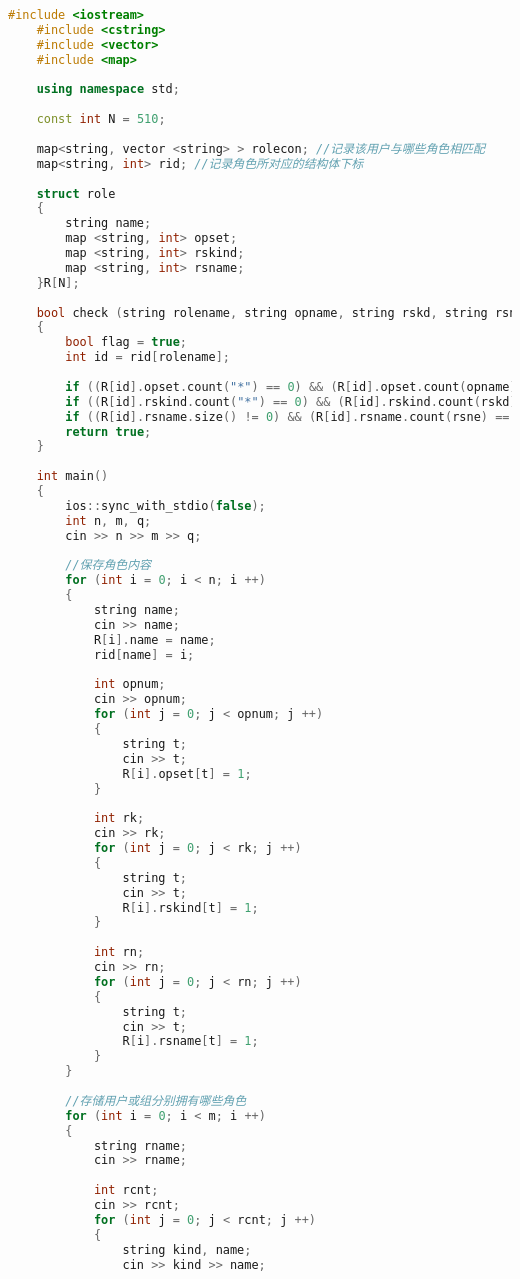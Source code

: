 \begin{lstlisting}[language=C++]
    #include <iostream>
    #include <cstring>
    #include <vector>
    #include <map>
    
    using namespace std;
    
    const int N = 510;
    
    map<string, vector <string> > rolecon; //记录该用户与哪些角色相匹配
    map<string, int> rid; //记录角色所对应的结构体下标
    
    struct role
    {
        string name;
        map <string, int> opset;
        map <string, int> rskind;
        map <string, int> rsname;
    }R[N];
    
    bool check (string rolename, string opname, string rskd, string rsne)
    {
        bool flag = true;
        int id = rid[rolename];
    
        if ((R[id].opset.count("*") == 0) && (R[id].opset.count(opname) == 0)) return false;
        if ((R[id].rskind.count("*") == 0) && (R[id].rskind.count(rskd) == 0)) return false;
        if ((R[id].rsname.size() != 0) && (R[id].rsname.count(rsne) == 0)) return false;
        return true;
    }
    
    int main()
    {
        ios::sync_with_stdio(false);
        int n, m, q;
        cin >> n >> m >> q;
    
        //保存角色内容
        for (int i = 0; i < n; i ++)
        {
            string name;
            cin >> name;
            R[i].name = name;
            rid[name] = i;
    
            int opnum;
            cin >> opnum;
            for (int j = 0; j < opnum; j ++)
            {
                string t;
                cin >> t;
                R[i].opset[t] = 1;
            }
    
            int rk;
            cin >> rk;
            for (int j = 0; j < rk; j ++)
            {
                string t;
                cin >> t;
                R[i].rskind[t] = 1;
            }
    
            int rn;
            cin >> rn;
            for (int j = 0; j < rn; j ++)
            {
                string t;
                cin >> t;
                R[i].rsname[t] = 1;
            }
        }
    
        //存储用户或组分别拥有哪些角色
        for (int i = 0; i < m; i ++)
        {
            string rname;
            cin >> rname;
    
            int rcnt;
            cin >> rcnt;
            for (int j = 0; j < rcnt; j ++)
            {
                string kind, name;
                cin >> kind >> name;
    

\end{lstlisting}
